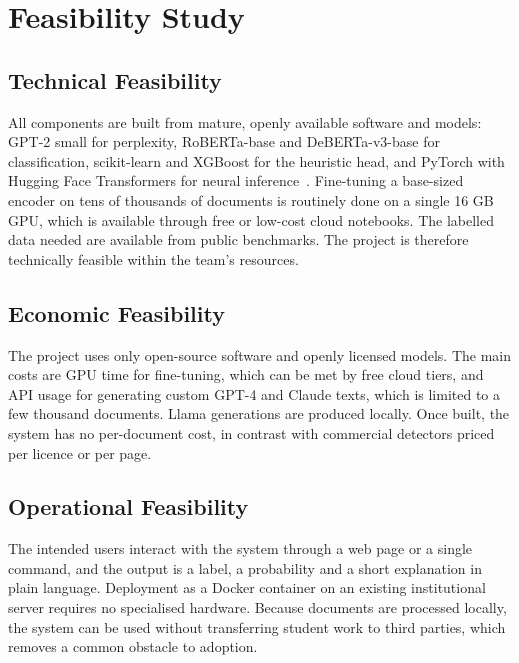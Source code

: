 \section{Feasibility Study}

\subsection{Technical Feasibility}

All components are built from mature, openly available software and models:
GPT-2 small for perplexity, RoBERTa-base and DeBERTa-v3-base for
classification, scikit-learn and XGBoost for the heuristic head, and PyTorch
with Hugging Face Transformers for neural inference~\cite{paszke2019pytorch,
wolf2020transformers,pedregosa2011sklearn,chen2016xgboost}. Fine-tuning a
base-sized encoder on tens of thousands of documents is routinely done on a
single 16 GB GPU, which is available through free or low-cost cloud notebooks.
The labelled data needed are available from public benchmarks. The project is
therefore technically feasible within the team's resources.

\subsection{Economic Feasibility}

The project uses only open-source software and openly licensed models. The
main costs are GPU time for fine-tuning, which can be met by free cloud tiers,
and API usage for generating custom GPT-4 and Claude texts, which is limited to
a few thousand documents. Llama generations are produced locally. Once built,
the system has no per-document cost, in contrast with commercial detectors
priced per licence or per page.

\subsection{Operational Feasibility}

The intended users interact with the system through a web page or a single
command, and the output is a label, a probability and a short explanation in
plain language. Deployment as a Docker container on an existing institutional
server requires no specialised hardware. Because documents are processed
locally, the system can be used without transferring student work to third
parties, which removes a common obstacle to adoption.

